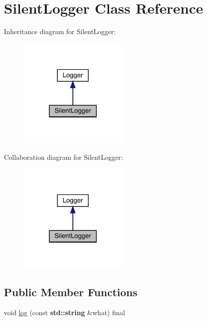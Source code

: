 \hypertarget{class_silent_logger}{}\section{Silent\+Logger Class Reference}
\label{class_silent_logger}


Inheritance diagram for Silent\+Logger\+:
\nopagebreak
\begin{figure}[H]
\begin{center}
\leavevmode
\includegraphics[width=152pt]{class_silent_logger__inherit__graph}
\end{center}
\end{figure}


Collaboration diagram for Silent\+Logger\+:
\nopagebreak
\begin{figure}[H]
\begin{center}
\leavevmode
\includegraphics[width=152pt]{class_silent_logger__coll__graph}
\end{center}
\end{figure}
\subsection*{Public Member Functions}
\begin{DoxyCompactItemize}
\item 
void \hyperlink{class_silent_logger_aa1b9872cb1585ec35051b3264d06aefd}{log} (const \textbf{ std\+::string} \&what) final
\end{DoxyCompactItemize}


